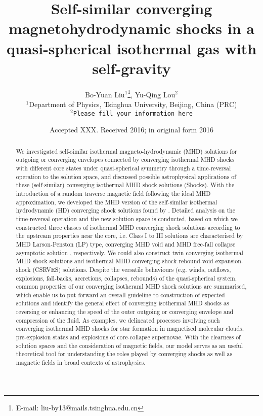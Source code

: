 \documentclass[fleqn,usenatbib]{mnras}
\title[Spherical converging isothermal MHD shocks with self-gravity]{Self-similar
  converging magnetohydrodynamic shocks in a quasi-spherical
 isothermal
 gas with self-gravity}
\author[Bo-Yuan Liu]{Bo-Yuan Liu$^{1}$\thanks{E-mail: liu-by13@mails.tsinghua.edu.cn}, Yu-Qing Lou$^{2}$
\\
$^{1}$Department of Physics, Tsinghua University, Beijing, China (PRC)\\
$^{2}$\texttt{Please fill your information here}
\\
}
\date{Accepted XXX. Received 2016; in original form 2016}
\begin{document}
\label{firstpage}
\pagerange{\pageref{firstpage}--\pageref{lastpage}}
\maketitle

\begin{abstract}
We investigated self-similar isothermal magneto-hydrodynamic (MHD) solutions for outgoing or converging envelopes connected by converging isothermal MHD shocks with different core states under quasi-spherical symmetry through a time-reversal operation to the solution space, and discussed possible astrophysical applications of these (self-similar) converging isothermal MHD shock solutions (Shocks). With the introduction of a random traverse magnetic field following the ideal MHD approximation, we developed the MHD version of the self-similar isothermal hydrodynamic (HD) converging shock solutions found by \citet{lou2014self}. 
Detailed analysis on the time-reversal operation and the new solution space is conducted, based on which we constructed three classes of isothermal MHD converging shock solutions according to the upstream properties near the core, i.e. Class I to III solutions are characterised by MHD Larson-Penston (LP) type, converging MHD void and MHD free-fall collapse asymptotic solution \citep{yuLou2006}, respectively. We could also construct twin converging isothermal MHD shock solutions and isothermal MHD converging-shock-rebound-void-expansion-shock (CSRVES) solutions. Despite the versatile behaviours (e.g. winds, outflows, explosions, fall-backs, accretions, collapses, rebounds) of the quasi-spherical system, common properties of our converging isotheraml MHD shock solutions are summarised, which enable us to put forward an overall guideline to construction of expected solutions and identify the general effect of converging isothermal MHD shocks as reversing or enhancing the speed of the outer outgoing or converging envelope and compression of the fluid. As examples, we delineated processes involving such converging isothermal MHD shocks for star formation in magnetised molecular clouds, pre-explosion states and explosions of core-collapse supernovae. With the clearness of solution spaces and the consideration of magnetic fields, our model serves as an useful theoretical tool for understanding the roles played by converging shocks as well as magnetic fields in broad contexts of astrophysics. 


\end{abstract}
\end{document}
